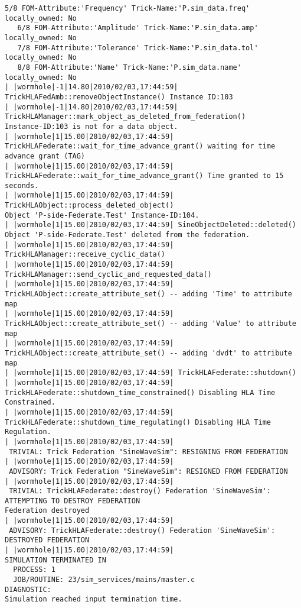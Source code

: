 \begin{lstlisting}[numbers=none,caption={output showing conditionally sent cyclic data}]
   5/8 FOM-Attribute:'Frequency' Trick-Name:'P.sim_data.freq' locally_owned: No
   6/8 FOM-Attribute:'Amplitude' Trick-Name:'P.sim_data.amp' locally_owned: No
   7/8 FOM-Attribute:'Tolerance' Trick-Name:'P.sim_data.tol' locally_owned: No
   8/8 FOM-Attribute:'Name' Trick-Name:'P.sim_data.name' locally_owned: No
| |wormhole|-1|14.80|2010/02/03,17:44:59| TrickHLAFedAmb::removeObjectInstance() Instance ID:103
| |wormhole|-1|14.80|2010/02/03,17:44:59| TrickHLAManager::mark_object_as_deleted_from_federation() 
Instance-ID:103 is not for a data object.
| |wormhole|1|15.00|2010/02/03,17:44:59| TrickHLAFederate::wait_for_time_advance_grant() waiting for time advance grant (TAG)
| |wormhole|1|15.00|2010/02/03,17:44:59| TrickHLAFederate::wait_for_time_advance_grant() Time granted to 15 seconds.
| |wormhole|1|15.00|2010/02/03,17:44:59| TrickHLAObject::process_deleted_object() 
Object 'P-side-Federate.Test' Instance-ID:104.
| |wormhole|1|15.00|2010/02/03,17:44:59| SineObjectDeleted::deleted() 
Object 'P-side-Federate.Test' deleted from the federation.
| |wormhole|1|15.00|2010/02/03,17:44:59| TrickHLAManager::receive_cyclic_data()
| |wormhole|1|15.00|2010/02/03,17:44:59| TrickHLAManager::send_cyclic_and_requested_data()
| |wormhole|1|15.00|2010/02/03,17:44:59| TrickHLAObject::create_attribute_set() -- adding 'Time' to attribute map
| |wormhole|1|15.00|2010/02/03,17:44:59| TrickHLAObject::create_attribute_set() -- adding 'Value' to attribute map
| |wormhole|1|15.00|2010/02/03,17:44:59| TrickHLAObject::create_attribute_set() -- adding 'dvdt' to attribute map
| |wormhole|1|15.00|2010/02/03,17:44:59| TrickHLAFederate::shutdown()
| |wormhole|1|15.00|2010/02/03,17:44:59| TrickHLAFederate::shutdown_time_constrained() Disabling HLA Time Constrained.
| |wormhole|1|15.00|2010/02/03,17:44:59| TrickHLAFederate::shutdown_time_regulating() Disabling HLA Time Regulation.
| |wormhole|1|15.00|2010/02/03,17:44:59| 
 TRIVIAL: Trick Federation "SineWaveSim": RESIGNING FROM FEDERATION
| |wormhole|1|15.00|2010/02/03,17:44:59| 
 ADVISORY: Trick Federation "SineWaveSim": RESIGNED FROM FEDERATION
| |wormhole|1|15.00|2010/02/03,17:44:59| 
 TRIVIAL: TrickHLAFederate::destroy() Federation 'SineWaveSim': ATTEMPTING TO DESTROY FEDERATION
Federation destroyed
| |wormhole|1|15.00|2010/02/03,17:44:59| 
 ADVISORY: TrickHLAFederate::destroy() Federation 'SineWaveSim': DESTROYED FEDERATION
| |wormhole|1|15.00|2010/02/03,17:44:59| 
SIMULATION TERMINATED IN
  PROCESS: 1
  JOB/ROUTINE: 23/sim_services/mains/master.c
DIAGNOSTIC:
Simulation reached input termination time.


\end{lstlisting}
